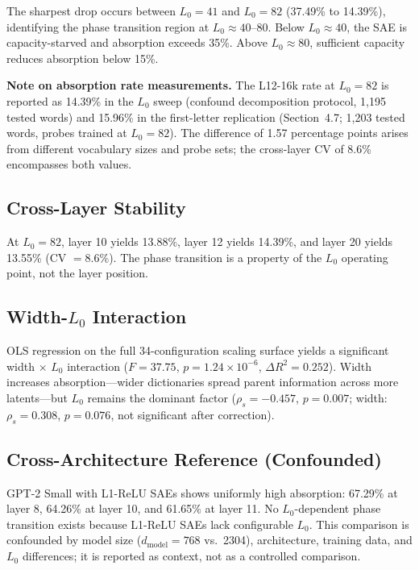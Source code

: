 \documentclass{article}
\begin{document}
The sharpest drop occurs between $L_0 = 41$ and $L_0 = 82$ (37.49\% to 14.39\%), identifying the phase transition region at $L_0 \approx 40$--$80$. Below $L_0 \approx 40$, the SAE is capacity-starved and absorption exceeds 35\%. Above $L_0 \approx 80$, sufficient capacity reduces absorption below 15\%.

\textbf{Note on absorption rate measurements.} The L12-16k rate at $L_0 = 82$ is reported as 14.39\% in the $L_0$ sweep (confound decomposition protocol, 1,195 tested words) and 15.96\% in the first-letter replication (Section~4.7; 1,203 tested words, probes trained at $L_0 = 82$). The difference of 1.57 percentage points arises from different vocabulary sizes and probe sets; the cross-layer CV of 8.6\% encompasses both values.

\subsection{Cross-Layer Stability}

At $L_0 = 82$, layer 10 yields 13.88\%, layer 12 yields 14.39\%, and layer 20 yields 13.55\% (CV $= 8.6\%$). The phase transition is a property of the $L_0$ operating point, not the layer position.

\subsection{Width-$L_0$ Interaction}

OLS regression on the full 34-configuration scaling surface yields a significant width $\times$ $L_0$ interaction ($F = 37.75$, $p = 1.24 \times 10^{-6}$, $\Delta R^2 = 0.252$). Width increases absorption---wider dictionaries spread parent information across more latents---but $L_0$ remains the dominant factor ($\rho_s = -0.457$, $p = 0.007$; width: $\rho_s = 0.308$, $p = 0.076$, not significant after correction).

\subsection{Cross-Architecture Reference (Confounded)}

GPT-2 Small with L1-ReLU SAEs shows uniformly high absorption: 67.29\% at layer 8, 64.26\% at layer 10, and 61.65\% at layer 11. No $L_0$-dependent phase transition exists because L1-ReLU SAEs lack configurable $L_0$. This comparison is confounded by model size ($d_{\text{model}} = 768$ vs.\ 2304), architecture, training data, and $L_0$ differences; it is reported as context, not as a controlled comparison.
\end{document}
